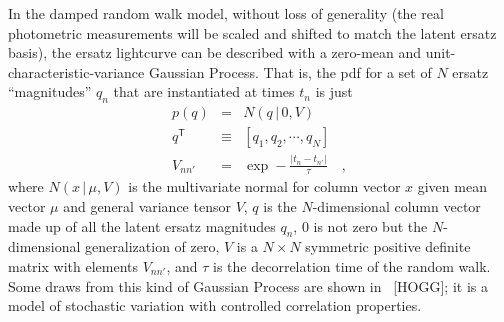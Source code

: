 \documentclass[letterpaper,12pt]{article}
\newcommand{\given}{\,|\,}
\newcommand{\transpose}[1]{{#1}^{\mathsf{T}}}
\begin{document}
In the damped random walk model, without loss of generality (the real
photometric measurements will be scaled and shifted to match the
latent ersatz basis), the ersatz lightcurve can be described with a
zero-mean and unit-characteristic-variance Gaussian Process.  That is,
the pdf for a set of $N$ ersatz ``magnitudes'' $q_n$ that are
instantiated at times $t_n$ is just
\begin{eqnarray}
p(q) &=& N(q\given 0,V)
\\
\transpose{q} &\equiv& [q_1, q_2, \cdots , q_N]
\\
V_{nn'} &=& \exp -\frac{|t_n - t_{n'}|}{\tau}
\quad ,
\end{eqnarray}
where $N(x\given\mu,V)$ is the multivariate normal for column vector
$x$ given mean vector $\mu$ and general variance tensor $V$, $q$ is
the $N$-dimensional column vector made up of all the latent ersatz
magnitudes $q_n$, $0$ is not zero but the $N$-dimensional
generalization of zero, $V$ is a $N\times N$ symmetric positive
definite matrix with elements $V_{nn'}$, and $\tau$ is the
decorrelation time of the random walk.  Some draws from this kind of
Gaussian Process are shown in \figurename~[HOGG]; it is a model of
stochastic variation with controlled correlation properties.
\end{document}
